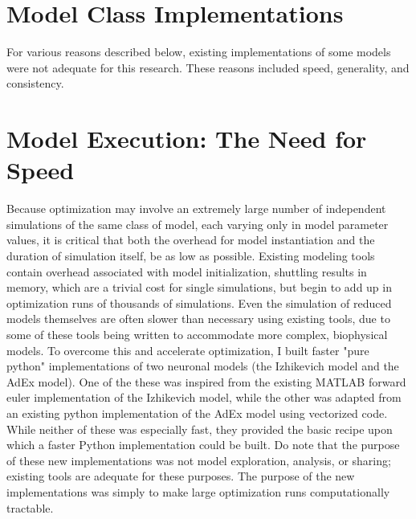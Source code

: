 \section{Model Class Implementations}
For various reasons described below, existing implementations of some models were not adequate for this research.
These reasons included speed, generality, and consistency.

\section{Model Execution: The Need for Speed}
Because optimization may involve an extremely large number of independent simulations of the same class of model, each varying only in model parameter values, it is critical that both the overhead for model instantiation and the duration of simulation itself, be as low as possible.
Existing modeling tools contain overhead associated with model initialization, shuttling results in memory, which are a trivial cost for single simulations, but begin to add up in optimization runs of thousands of simulations.  
Even the simulation of reduced models themselves are often slower than necessary using existing tools, due to some of these tools being written to accommodate more complex, biophysical models.
To overcome this and accelerate optimization, I built faster "pure python" implementations of two neuronal models (the Izhikevich model and the AdEx model).
One of the these was inspired from the existing MATLAB forward euler implementation of the Izhikevich model, while the other was adapted from an existing python implementation of the AdEx model using vectorized code.
While neither of these was especially fast, they provided the basic recipe upon which a faster Python implementation could be built.
Do note that the purpose of these new implementations was not model exploration, analysis, or sharing; existing tools are adequate for these purposes.
The purpose of the new implementations was simply to make large optimization runs computationally tractable.

